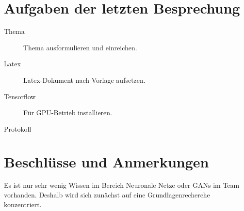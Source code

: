
\newcommand{\Titel}{1. Protokoll}
\newcommand{\Teilnehmer}{Jonas Bürgel, Patrick Welter}
\newcommand{\DatumUndZeit}{18.10.2021 20:00-20:15}
\newcommand{\Ort}{Discord Meeting}
\newcommand{\Thema}{Literaturrecherche}


\section{Aufgaben der letzten Besprechung}
\begin{description}
	\item[Thema] Thema ausformulieren und einreichen.  \fullcheck
	\item[Latex] Latex-Dokument nach Vorlage aufsetzen.  \fullcheck
	\item[Tensorflow] Für GPU-Betrieb installieren.  \fullcheck
	\item[Protokoll]  \fullcheck
\end{description}

\section{Beschlüsse und Anmerkungen}
\begin{description}[style=nextline]
	\item[Recherche]
	Es ist nur sehr wenig Wissen im Bereich Neuronale Netze oder GANs im Team vorhanden.
	Deshalb wird sich zunächst auf eine Grundlagenrecherche konzentriert.
\end{description}

